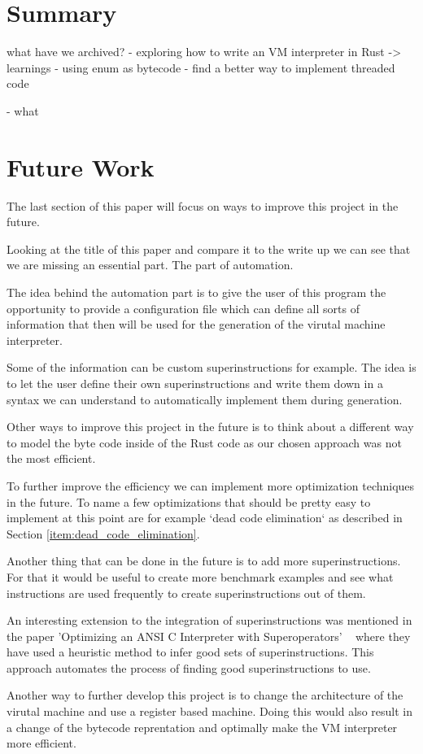 \documentclass{article}
\begin{document}
\section{Summary}
what have we archived?
- exploring how to write an VM interpreter in Rust
    -> learnings
        - using enum as bytecode
        - find a better way to implement threaded code

- what 


\section{Future Work}
\label{sec:future}
The last section of this paper will focus on ways to improve this project
in the future.

Looking at the title of this paper and compare it to the write up we can see
that we are missing an essential part. The part of automation.

The idea behind the automation part is to give the user of this program
the opportunity to provide a configuration file which can define all 
sorts of information that then will be used for the generation of the
virutal machine interpreter.

Some of the information can be custom superinstructions for example. The idea
is to let the user define their own superinstructions and write them down in a
syntax we can understand to automatically implement them during generation.

Other ways to improve this project in the future is to think about a different
way to model the byte code inside of the Rust code as our chosen approach was
not the most efficient. 

To further improve the efficiency we can implement more optimization techniques
in the future. To name a few optimizations that should be pretty easy to
implement at this point are for example `dead code elimination` as described in
Section \ref{item:dead_code_elimination}.

Another thing that can be done in the future is to add more superinstructions.
For that it would be useful to create more benchmark examples and see what
instructions are used frequently to create superinstructions out of them.

An interesting extension to the integration of superinstructions was mentioned
in the paper 'Optimizing an ANSI C Interpreter with Superoperators'
~\cite{superoperators} where they have used a heuristic method to infer good
sets of superinstructions. This approach automates the process of finding good
superinstructions to use.

Another way to further develop this project is to change the architecture of the
virutal machine and use a register based machine. Doing this would also result
in a change of the bytecode reprentation and optimally make the VM interpreter
more efficient.

\clearpage


\end{document}

